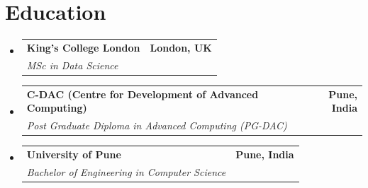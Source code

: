 \documentclass[a4paper,10pt]{article}
\makeatletter
\newcommand{\resumeSubheading}[4]{
  \vspace{-3pt}\item
    \begin{tabular*}{1.0\textwidth}[t]{l@{\extracolsep{\fill}}r}
      \textbf{\color{accent}#1} & \textbf{\small\color{muted}#2} \\
      \textit{\small#3} & \textit{\small\color{muted}#4} \\
    \end{tabular*}\vspace{-7pt}
}
\newcommand{\resumeSubHeadingListStart}{\begin{itemize}[leftmargin=0.0in, label={}]}
\newcommand{\resumeSubHeadingListEnd}{\end{itemize}}
\makeatother
\begin{document}
\section{Education}
  \resumeSubHeadingListStart
    \resumeSubheading
      {King's College London}{London, UK}
      {MSc in Data Science}{}

    \resumeSubheading
      {C-DAC (Centre for Development of Advanced Computing)}{Pune, India}
      {Post Graduate Diploma in Advanced Computing (PG-DAC)}{}

    \resumeSubheading
      {University of Pune}{Pune, India}
      {Bachelor of Engineering in Computer Science}{}
  \resumeSubHeadingListEnd

\end{document}
